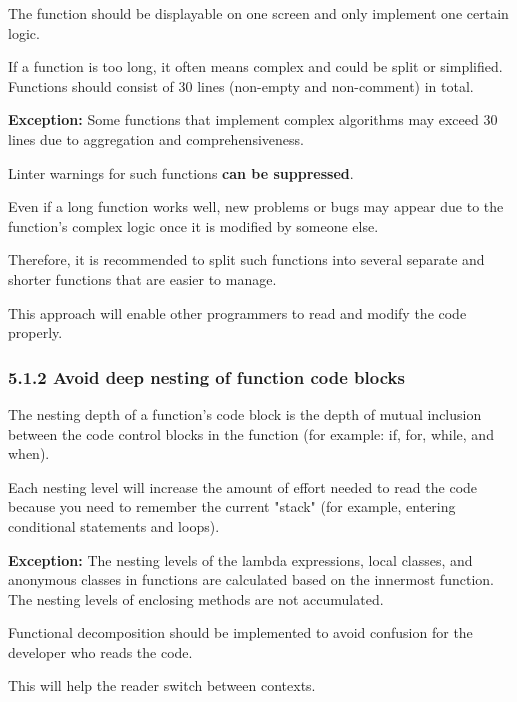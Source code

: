 {{{{\label{sec:5.1.1}



The function should be displayable on one screen and only implement one certain logic.

If a function is too long, it often means complex and could be split or simplified. Functions should consist of 30 lines (non-empty and non-comment) in total.



\textbf{Exception:} Some functions that implement complex algorithms may exceed 30 lines due to aggregation and comprehensiveness.

Linter warnings for such functions \textbf{can be suppressed}. 



Even if a long function works well, new problems or bugs may appear due to the function's complex logic once it is modified by someone else.

Therefore, it is recommended to split such functions into several separate and shorter functions that are easier to manage.

This approach will enable other programmers to read and modify the code properly.

\subsubsection*{\textbf{5.1.2 Avoid deep nesting of function code blocks}}
\leavevmode\newline

\label{sec:5.1.2}



The nesting depth of a function's code block is the depth of mutual inclusion between the code control blocks in the function (for example: if, for, while, and when).

Each nesting level will increase the amount of effort needed to read the code because you need to remember the current "stack" (for example, entering conditional statements and loops). 

\textbf{Exception:} The nesting levels of the lambda expressions, local classes, and anonymous classes in functions are calculated based on the innermost function. The nesting levels of enclosing methods are not accumulated.

Functional decomposition should be implemented to avoid confusion for the developer who reads the code.

This will help the reader switch between contexts.



}}}}
